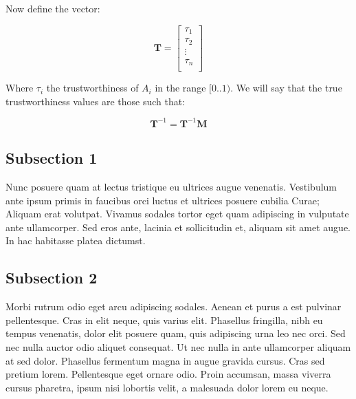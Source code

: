 Now define the vector:

\begin{equation}
    \mathbf{T} = 
    \begin{bmatrix}
    \tau_1 \\
    \tau_2 \\
    \vdots \\
    \tau_n \\
    \end{bmatrix}
\end{equation}

Where $\tau_i$ the trustworthiness of $A_i$ in the range $[0..1)$. We will say that the true trustworthiness values are those such that:

\begin{equation}
    \mathbf{T}^{-1} = \mathbf{T}^{-1}\mathbf{M}
\end{equation}
\subsection{Subsection 1}

Nunc posuere quam at lectus tristique eu ultrices augue venenatis. Vestibulum ante ipsum primis in faucibus orci luctus et ultrices posuere cubilia Curae; Aliquam erat volutpat. Vivamus sodales tortor eget quam adipiscing in vulputate ante ullamcorper. Sed eros ante, lacinia et sollicitudin et, aliquam sit amet augue. In hac habitasse platea dictumst.


\subsection{Subsection 2}
Morbi rutrum odio eget arcu adipiscing sodales. Aenean et purus a est pulvinar pellentesque. Cras in elit neque, quis varius elit. Phasellus fringilla, nibh eu tempus venenatis, dolor elit posuere quam, quis adipiscing urna leo nec orci. Sed nec nulla auctor odio aliquet consequat. Ut nec nulla in ante ullamcorper aliquam at sed dolor. Phasellus fermentum magna in augue gravida cursus. Cras sed pretium lorem. Pellentesque eget ornare odio. Proin accumsan, massa viverra cursus pharetra, ipsum nisi lobortis velit, a malesuada dolor lorem eu neque.


